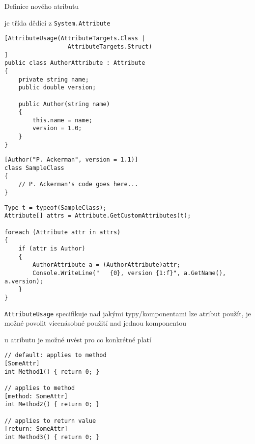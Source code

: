 \begin{frame}[fragile]
\vfill
\begin{bitemize}{Definice nového atributu}
\item je třída dědící z \lstinline|System.Attribute|
\end{bitemize}
\vfill
\begin{yesblock}
\begin{lstlisting}
[AttributeUsage(AttributeTargets.Class |  
                  AttributeTargets.Struct)  
]  
public class AuthorAttribute : Attribute  
{  
    private string name;  
    public double version;  

    public Author(string name)  
    {  
        this.name = name;  
        version = 1.0;  
    }  
}  
\end{lstlisting}
\end{yesblock}
\vfill
\end{frame}


\begin{frame}[fragile]
\vfill
\begin{yesblock}
\begin{lstlisting}
[Author("P. Ackerman", version = 1.1)]  
class SampleClass  
{  
    // P. Ackerman's code goes here...  
}  
\end{lstlisting}
\end{yesblock}
\vfill
\begin{yesblock}
\begin{lstlisting}
Type t = typeof(SampleClass);
Attribute[] attrs = Attribute.GetCustomAttributes(t);

foreach (Attribute attr in attrs)  
{  
    if (attr is Author)  
    {  
        AuthorAttribute a = (AuthorAttribute)attr;  
        Console.WriteLine("   {0}, version {1:f}", a.GetName(), a.version);  
    }  
}  
\end{lstlisting}
\end{yesblock}
\vfill
\end{frame}



\begin{frame}[fragile]
\vfill
\begin{bitemize}{}
\item \lstinline|AttributeUsage| specifikuje nad jakými typy/komponentami lze atribut použít, je možné povolit vícenásobné použití nad jednou komponentou
\item u atributu je možné uvést pro co konkrétné platí
\end{bitemize}
\vfill
\begin{yesblock}
\begin{lstlisting}
// default: applies to method  
[SomeAttr]  
int Method1() { return 0; }  

// applies to method  
[method: SomeAttr]  
int Method2() { return 0; }  

// applies to return value  
[return: SomeAttr]  
int Method3() { return 0; }  
\end{lstlisting}
\end{yesblock}
\vfill
\end{frame}



\zkouskove
